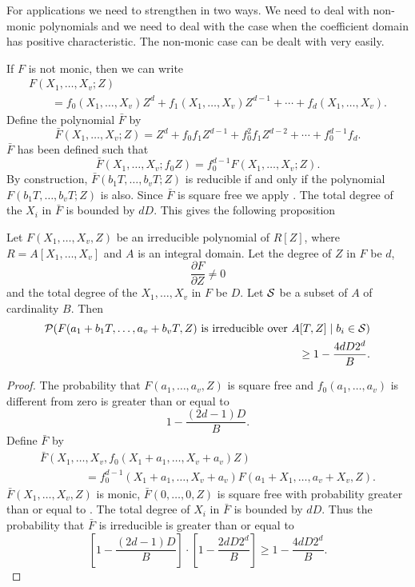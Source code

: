 For applications we need to strengthen  in two
ways.  We need to deal with non-monic polynomials and we need to deal
with the case when the coefficient domain has positive characteristic.
The non-monic case can be dealt with very easily.  

If $F$ is not monic, then we can write
\[
\begin{aligned}
F(X_1, \ldots, X_v; Z)\\
 \qquad = f_0(X_1, \ldots, X_v) Z^d + f_1(X_1, \ldots, X_v) Z^{d-1} + 
  \cdots + f_d(X_1, \ldots, X_v).
\end{aligned}
\]
Define the polynomial $\bar{F}$ by
\[
\bar{F}(X_1, \ldots, X_v; Z)
  = Z^d + f_0 f_1 Z^{d-1} + f_0^2 f_1 Z^{d-2} + \cdots + f_0^{d-1} f_d.
\]
$\bar{F}$ has been defined such that
\[
\bar{F}(X_1, \ldots, X_v; f_0 Z) = f_0^{d-1} F(X_1, \ldots, X_v; Z).
\]
By construction, $\bar{F}(b_1 T, \ldots, b_v T; Z)$ is reducible if
and only if the polynomial $F(b_1 T, \ldots, b_v T; Z)$ is also.
Since $\bar{F}$ is square free we apply .  The
total degree of the $X_i$ in $\bar{F}$ is bounded by $dD$.  This gives
the following proposition

\begin{proposition} \label{NonMonic:KIT:Prop}
Let $F(X_1, \ldots, X_v, Z)$ be an irreducible polynomial of $R[Z]$,
where $R = A[X_1, \ldots, X_v]$ and $A$ is an integral domain.  Let
the degree of $Z$ in $F$ be $d$,
\[
\frac{\partial F}{\partial Z} \not= 0
\]
and the total degree of the $X_1, \ldots, X_v$ in $F$ be $D$.  Let
${\cal S}$ be a subset of $A$ of cardinality $B$.  Then
\[
\begin{aligned}
{\cal P}(\mbox{$F(a_1 + b_1 T, \ldots, a_v + b_v T, Z)$ is irreducible over $A[T, Z]$}
   \mid b_i \in {\cal S})\\
 \qquad \ge 1 - \frac{4dD 2^{d}}{B}.
\end{aligned}
\]
\end{proposition}

\begin{proof}
The probability that $F(a_1, \ldots, a_v, Z)$ is square free and
$f_0(a_1, \ldots, a_v)$ is different from zero is greater than or
equal to
\begin{equation}\label{HIT:Sqfr:Eq}
1 - \frac{(2d -1) D}{B}.
\end{equation}
Define $\bar{F}$ by
\[
\begin{aligned}
\bar{F}(X_1, \ldots, X_v, f_0(X_1 + a_1, \ldots, X_v + a_v) Z) \\
  \qquad\qquad= f_0^{d-1}(X_1 + a_1, \ldots, X_v + a_v) 
   F(a_1 + X_1, \ldots, a_v + X_v, Z).
\end{aligned}
\]
$\bar{F}(X_1, \ldots, X_v, Z)$ is monic, $\bar{F}(0, \ldots, 0, Z)$ is
square free  with probability greater than or equal to
.
The total degree of $X_i$ in $\bar{F}$ is bounded by $dD$.  Thus the
probability that $\bar{F}$ is irreducible is greater than or equal to
\[
\left[1 - \frac{(2d-1)D}{B}\right] \cdot
\left[1 - \frac{2 d D 2^d}{B} \right] \ge 1 - \frac{4dD2^d}{B}.
\]
\end{proof}

